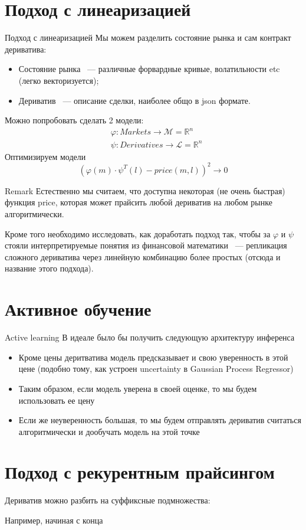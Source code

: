 \documentclass[10pt]{beamer}
\newcommand{\R}{\ensuremath{\mathbb{R}}}
\renewcommand{\phi}{\varphi}
\begin{document}
    \section{Подход с линеаризацией}
    \begin{frame}{Подход с линеаризацией}
        Мы можем разделить состояние рынка и сам контракт дериватива:
        \begin{itemize}
            \item Состояние рынка ~--- различные форвардные кривые, волатильности etc (легко векторизуется);
            \item Дериватив ~--- описание сделки, наиболее общо в json формате.
        \end{itemize}

        Можно попробовать сделать 2 модели:
        \begin{align*}
            & \phi: Markets \to \mathcal{M} = \R^n \\
            & \psi: Derivatives \to \mathcal{L} = \R^n
        \end{align*}
        Оптимизируем модели 
        \[
            \left( \phi(m) \cdot \psi^T(l) - price(m, l) \right)^2 \to 0
        \]

        \begin{block}{Remark}
            Естественно мы считаем, что доступна некоторая (не очень быстрая) функция price, которая может прайсить любой дериватив на любом рынке алгоритмически.
        \end{block}

        Кроме того необходимо исследовать, как доработать подход так, чтобы за $\phi$ и $\psi$ стояли интерпретируемые понятия из финансовой математики 
        ~--- репликация сложного дериватива через линейную комбинацию более простых (отсюда и название этого подхода).
    \end{frame}

    \section{Активное обучение}
    \begin{frame}{Active learning}
        В идеале было бы получить следующую архитектуру инференса
        \begin{itemize}
            \item Кроме цены деритватива модель предсказывает и свою уверенность в этой цене (подобно тому, как устроен uncertainty в Gaussian Process Regressor)
            \item Таким образом, если модель уверена в своей оценке, то мы будем использовать ее цену
            \item Если же неуверенность большая, то мы будем отправлять дериватив считаться алгоритмически и дообучать модель на этой точке
        \end{itemize}
    \end{frame}

    \section{Подход с рекурентным прайсингом}
    \begin{frame}
        Дериватив можно разбить на суффиксные подмножества: 
        
        Например, начиная с конца
    \end{frame}
\end{document}
